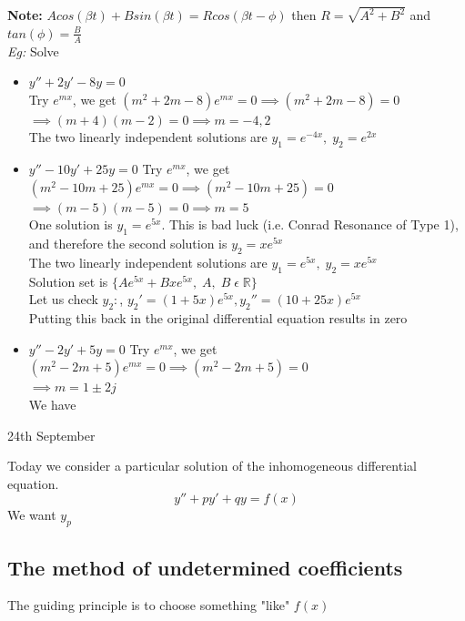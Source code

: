 \documentclass[11pt]{article}
\theoremstyle{definition}
\newcommand{\R}{\mathbb{R}}
\begin{document}
\textbf{Note:} $Acos(\beta t) + B sin(\beta t) = Rcos(\beta t - \phi)$
then $R = \sqrt{A^2 + B^2}$ and $tan(\phi) = \frac{B}{A}$\\
\textit{Eg:} Solve 
\begin{itemize}[topsep=-10pt]
    \item $y'' + 2y' -8y = 0$\\
    Try $e^{mx}$, we get $(m^2 + 2m - 8)e^{mx} = 0 \implies (m^2 + 2m - 8) = 0$ \\$\implies (m+4)(m-2) = 0 \implies m = -4, 2$\\
    The two linearly independent solutions are $y_1 = e^{-4x},\; y_2 = e^{2x}$
    \item $y'' - 10y' + 25y = 0$
    Try $e^{mx}$, we get $(m^2 -10m + 25)e^{mx} = 0 \implies (m^2 -10m + 25) = 0$ \\$\implies (m-5)(m-5) = 0 \implies m = 5$\\
    One solution is $y_1 = e^{5x}$. This is bad luck (i.e. Conrad Resonance of Type 1), and therefore the second solution is $y_2 = xe^{5x}$\\
    The two linearly independent solutions are $y_1 = e^{5x},\; y_2 = xe^{5x}$\\
    Solution set is $\{Ae^{5x} + Bxe^{5x},\; A,\; B\; \epsilon\; \R\}$\\
    Let us check $y_2: $, $y_2' = (1+5x)e^{5x}, y_2'' = (10 + 25x)e^{5x}$ \\
    Putting this back in the original differential equation results in zero
    \item $y'' - 2y' + 5y = 0$
    Try $e^{mx}$, we get $(m^2 - 2m + 5)e^{mx} = 0 \implies (m^2 - 2m + 5) = 0$ \\$ \implies m = 1 \pm 2j$\\
    We have
    
\end{itemize}
\newpage
\begin{center}
    {\LARGE 24th September}\\
\end{center}
Today we consider a particular solution of the inhomogeneous differential equation.
$$y'' + py' + qy = f(x)$$
We want $y_p$
\subsection{The method of undetermined coefficients}
The guiding principle is to choose something "like" $f(x)$
\end{document}
